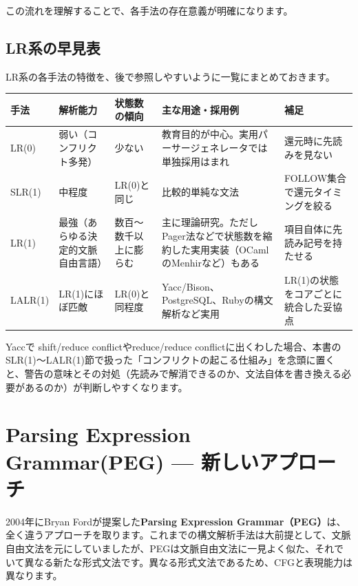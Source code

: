 この流れを理解することで、各手法の存在意義が明確になります。

\subsection{LR系の早見表}

LR系の各手法の特徴を、後で参照しやすいように一覧にまとめておきます。

\begin{table}[htb]
  \small
  \begin{center}
    \begin{tabular}{lp{2cm}p{2cm}p{3.5cm}p{3cm}}\hline
      手法 & 解析能力 & 状態数の傾向 & 主な用途・採用例 & 補足\\ \hline
LR(0) & 弱い（コンフリクト多発） & 少ない & 教育目的が中心。実用パーサージェネレータでは単独採用はまれ & 還元時に先読みを見ない\\ \hline
SLR(1) & 中程度 & LR(0)と同じ & 比較的単純な文法 & FOLLOW集合で還元タイミングを絞る\\ \hline
LR(1) & 最強（あらゆる決定的文脈自由言語） & 数百〜数千以上に膨らむ & 主に理論研究。ただしPager法などで状態数を縮約した実用実装（OCamlのMenhirなど）もある & 項目自体に先読み記号を持たせる\\ \hline
LALR(1) & LR(1)にほぼ匹敵 & LR(0)と同程度 & Yacc/Bison、PostgreSQL、Rubyの構文解析など実用 & LR(1)の状態をコアごとに統合した妥協点\\ \hline
    \end{tabular}
  \end{center}
\end{table}

Yaccで shift/reduce conflictやreduce/reduce
conflictに出くわした場合、本書のSLR(1)〜LALR(1)節で扱った「コンフリクトの起こる仕組み」を念頭に置くと、警告の意味とその対処（先読みで解消できるのか、文法自体を書き換える必要があるのか）が判断しやすくなります。

\section{Parsing Expression Grammar(PEG) --- 新しいアプローチ}

2004年にBryan Fordが提案した\textbf{\sffamily Parsing Expression
Grammar（PEG）}は、全く違うアプローチを取ります。これまでの構文解析手法は大前提として、文脈自由文法を元にしていましたが、PEGは文脈自由文法に一見よく似た、それでいて異なる新たな形式文法です。異なる形式文法であるため、CFGと表現能力は異なります。

